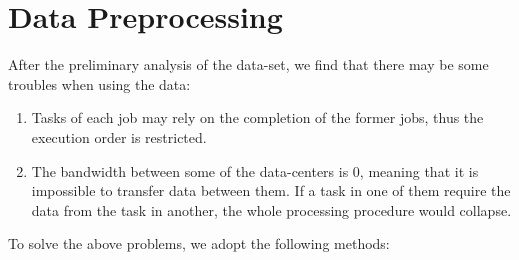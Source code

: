 \documentclass{llncs}
\begin{document}
\section{Data Preprocessing}
After the preliminary analysis of the data-set, we find that there may be some troubles when using the data:
\begin{enumerate}
    \item Tasks of each job may rely on the completion of the former jobs, thus the execution order is restricted.
    \item The bandwidth between some of the data-centers is $0$, meaning that it is impossible to transfer data between them. If a task in one of them require the data from the task in another, the whole processing procedure would collapse.
\end{enumerate}
To solve the above problems, we adopt the following methods:
\end{document}
